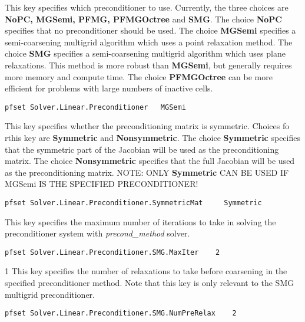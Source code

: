 {This key specifies which preconditioner to use.  Currently, the three choices
are {\bf NoPC, MGSemi, PFMG, PFMGOctree} and {\bf SMG}.  The choice {\bf NoPC} specifies that no
preconditioner should be used.  The choice {\bf MGSemi} specifies
a semi-coarsening multigrid algorithm which uses a point relaxation method.
The choice {\bf SMG} specifies a semi-coarsening multigrid algorithm which uses
plane relaxations.  This method is more robust than {\bf MGSemi}, but generally
requires more memory and compute time. The choice {\bf PFMGOctree} can be more efficient for problems with large numbers of inactive cells.
}
\begin{display}\begin{verbatim}
pfset Solver.Linear.Preconditioner   MGSemi
\end{verbatim}\end{display}


{This key specifies whether the preconditioning matrix is symmetric.
Choices fo rthis key are {\bf Symmetric} and {\bf Nonsymmetric}.
The choice {\bf Symmetric} specifies that the symmetric part of the Jacobian
will be used as the preconditioning matrix.  The choice {\bf Nonsymmetric}
specifies that the full Jacobian will be used as the preconditioning matrix.
NOTE: ONLY {\bf Symmetric} CAN BE USED IF MGSemi IS THE SPECIFIED
PRECONDITIONER!
}
\begin{display}\begin{verbatim}
pfset Solver.Linear.Preconditioner.SymmetricMat     Symmetric
\end{verbatim}\end{display}

{This key specifies the maximum number of iterations to take in solving the
preconditioner system with {\em precond\_method} solver.
}
\begin{display}\begin{verbatim}
pfset Solver.Linear.Preconditioner.SMG.MaxIter    2
\end{verbatim}\end{display}

{1}
{This key specifies the number of relaxations to take before coarsening in the
specified preconditioner method.  Note that this key is only relevant to
the SMG multigrid preconditioner.
}
\begin{display}\begin{verbatim}
pfset Solver.Linear.Preconditioner.SMG.NumPreRelax    2
\end{verbatim}\end{display}

